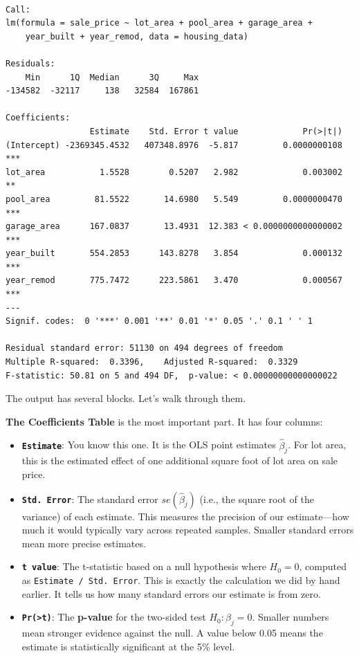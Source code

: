 \documentclass[
  letterpaper,
  DIV=11,
  numbers=noendperiod]{scrreprt}
\begin{document}
\begin{verbatim}

Call:
lm(formula = sale_price ~ lot_area + pool_area + garage_area + 
    year_built + year_remod, data = housing_data)

Residuals:
    Min      1Q  Median      3Q     Max 
-134582  -32117     138   32584  167861 

Coefficients:
                 Estimate    Std. Error t value             Pr(>|t|)    
(Intercept) -2369345.4532   407348.8976  -5.817         0.0000000108 ***
lot_area           1.5528        0.5207   2.982             0.003002 ** 
pool_area         81.5522       14.6980   5.549         0.0000000470 ***
garage_area      167.0837       13.4931  12.383 < 0.0000000000000002 ***
year_built       554.2853      143.8278   3.854             0.000132 ***
year_remod       775.7472      223.5861   3.470             0.000567 ***
---
Signif. codes:  0 '***' 0.001 '**' 0.01 '*' 0.05 '.' 0.1 ' ' 1

Residual standard error: 51130 on 494 degrees of freedom
Multiple R-squared:  0.3396,    Adjusted R-squared:  0.3329 
F-statistic: 50.81 on 5 and 494 DF,  p-value: < 0.00000000000000022
\end{verbatim}

The output has several blocks. Let's walk through them.

\textbf{The Coefficients Table} is the most important part. It has four
columns:

\begin{itemize}
\item
  \textbf{\texttt{Estimate}}: You know this one. It is the OLS point
  estimates \(\hat{\beta}_j\). For lot area, this is the estimated
  effect of one additional square foot of lot area on sale price.
\item
  \textbf{\texttt{Std.\ Error}}: The standard error
  \(se(\hat{\beta}_j)\) (i.e., the square root of the variance) of each
  estimate. This measures the precision of our estimate---how much it
  would typically vary across repeated samples. Smaller standard errors
  mean more precise estimates.
\item
  \textbf{\texttt{t\ value}}: The t-statistic based on a null hypothesis
  where \(H_0 = 0\), computed as \texttt{Estimate\ /\ Std.\ Error}. This
  is exactly the calculation we did by hand earlier. It tells us how
  many standard errors our estimate is from zero.
\item
  \textbf{\texttt{Pr(\textgreater{}\textbar{}t\textbar{})}}: The
  \textbf{p-value} for the two-sided test \(H_0: \beta_j = 0\). Smaller
  numbers mean stronger evidence against the null. A value below 0.05
  means the estimate is statistically significant at the 5\% level.
\end{itemize}
\end{document}
